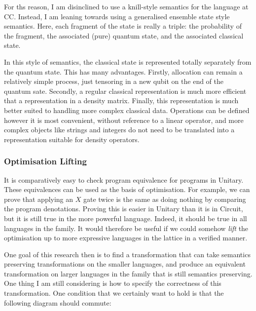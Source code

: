 For ths reason, I am disinclined to use a knill-style semantics for the language at CC.
% 
Instead, I am leaning towards using a generalised ensemble state style semantics.
% 
Here, each fragment of the state is really a triple: the probability of the fragment, the associated (pure) quantum state, and the associated classical state.


In this style of semantics, the classical state is represented totally separately from the quantum state. 
% 
This has many advantages.
% 
Firstly, allocation can remain a relatively simple process, just tensoring in a new qubit on the end of the quantum sate.
% 
Secondly, a regular classical representation is much more efficient that a representation in a density matrix.
% 
Finally, this representation is much better suited to handling more complex classical data.
% 
Operations can be defined however it is most convenient, without reference to a linear operator,
and more complex objects like strings and integers do not need to be translated into a representation suitable for density operators.


\subsubsection{Optimisation Lifting}
It is comparatively easy to check program equivalence for programs in Unitary. 
% 
These equivalences can be used as the basis of optimisation.
% 
For example, we can prove that applying an $X$ gate twice is the same as doing nothing
by comparing the program denotations.
% 
Proving this is easier in Unitary than it is in Circuit, but it is still true in the more powerful language.
%  
Indeed, it should be true in all languages in the family.
% 
It would therefore be useful if we could somehow \emph{lift} the optimisation up
to more expressive languages in the lattice in a verified manner.


One goal of this research then is to find a transformation that can take semantics preserving transformations 
on the smaller languages, and produce an equivalent transformation on larger languages in the family that is still semantics preserving.
% 
One thing I am still considering is how to specify the correctness of this transformation.
% 
One condition that we certainly want to hold is that the following diagram should commute:

